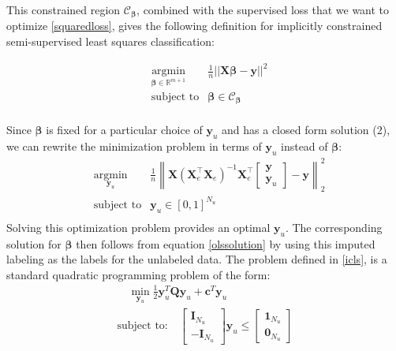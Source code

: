 \documentclass{elsarticle}
\newcommand{\X}{\mathbf{X}  }
\newcommand{\Xe}{\mathbf{X}_e  }
\newcommand{\XeT}{\mathbf{X}_e^{\top}}
\newcommand{\ye}{\begin{bmatrix} \mathbf{y}  \\ \mathbf{y}_u \end{bmatrix}}
\begin{document}
This constrained region $\mathcal{C}_{\boldsymbol{\beta}}$, combined with the supervised loss that we want to optimize \eqref{squaredloss}, gives the following definition for implicitly constrained semi-supervised least squares classification:

\begin{center}
\begin{equation}
\begin{aligned}
&\operatorname*{argmin}_{\boldsymbol{\beta} \in \mathbb{R}^{m+1}} & \frac{1}{n}  ||\mathbf{X} \boldsymbol{\beta}-\mathbf{y}||^2  \\
& \text{subject to} & \boldsymbol{\beta} \in \mathcal{C}_{\boldsymbol{\beta}}  \\
\end{aligned}
\end{equation}
\end{center}
Since $\boldsymbol{\beta}$ is fixed for a particular choice of $\textbf{y}_u$ and has a closed form solution (2), we can rewrite the minimization problem in terms of $\textbf{y}_u$ instead of $\boldsymbol{\beta}$:
\begin{equation} \label{icls}
\begin{aligned}
& \operatorname*{argmin}_{\mathbf{y}_u} & \frac{1}{n}  \left\|  \X \left(\XeT \Xe \right)^{-1} \XeT \ye - \mathbf{y} \right\|_2^2 \\ 
& \text{subject to} & \mathbf{y}_u \in [0,1]^{N_u} \\
\end{aligned}
\end{equation}
Solving this optimization problem provides an optimal $\mathbf{y}_u$. The corresponding solution for $\boldsymbol{\beta}$ then follows from equation \eqref{olssolution} by using this imputed labeling as the labels for the unlabeled data. The problem defined in \eqref{icls}, is a standard quadratic programming problem of the form:
\begin{equation}
\begin{aligned}
& \quad \min_{\mathbf{y}_u} \frac{1}{2} \textbf{y}_u^T  \textbf{Q}  \textbf{y}_u + \textbf{c}^T \textbf{y}_u   & \\
& \text{subject to:}  \quad \begin{bmatrix} \textbf{I}_{N_u}  \\ -\textbf{I}_{N_u} \end{bmatrix}  \textbf{y}_u \leq \begin{bmatrix} \textbf{1}_{N_u}  \\ \textbf{0}_{N_u} \end{bmatrix} & \\
\end{aligned}
\end{equation}
\end{document}
